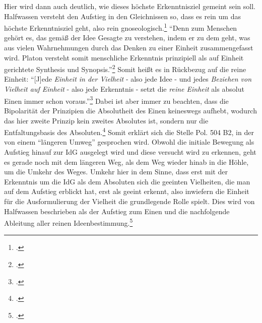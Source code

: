 Hier wird dann auch deutlich, wie dieses höchste Erkenntnisziel gemeint sein soll.
Halfwassen versteht den Aufstieg in den Gleichnissen so, dass es rein um das höchste Erkenntnisziel geht, also rein gnoseologisch.\footcite[vgl.][S. 226]{halfwassenaufstieg2006}
\enquote{Denn zum Menschen gehört es, das gemäß der Idee Gesagte zu verstehen, indem er zu dem geht, was aus vielen Wahrnehmungen durch das Denken zu einer Einheit zusammengefasst wird. Platon versteht somit menschliche Erkenntnis prinzipiell als auf Einheit gerichtete Synthesis und Synopsis.}\footcite[][S. 228]{halfwassenaufstieg2006}
Somit heißt es in Rückbezug auf die reine Einheit:
\enquote{[J]ede \emph{Einheit in der Vielheit} - also jede Idee - und jedes \emph{Beziehen von Vielheit auf Einheit} - also jede Erkenntnis - setzt die \emph{reine Einheit} als absolut Einen immer schon voraus.}\footcite[][S. 230]{halfwassenaufstieg2006}
Dabei ist aber immer zu beachten, dass die Bipolarität der Prinzipien die Absolutheit des Einen keineswegs aufhebt, wodurch das hier zweite Prinzip kein zweites Absolutes ist, sondern nur die Entfaltungsbasis des Absoluten.\footcite[vgl.][S. 53]{HalfwassenGeistmetaphysik}
Somit erklärt sich die Stelle Pol. 504 B2, in der von einem \enquote{längeren Umweg} gesprochen wird. Obwohl die initiale Bewegung als Aufstieg hinauf zur IdG ausgelegt wird und diese versucht wird zu erkennen, geht es gerade noch mit dem längeren Weg, als dem Weg wieder hinab in die Höhle, um die Umkehr des Weges. Umkehr hier in dem Sinne, dass erst mit der Erkenntnis um die IdG als dem Absoluten sich die geeinten Vielheiten, die man auf dem Aufstieg erblickt hat, erst als geeint erkennt, also inwiefern die Einheit für die Ausformulierung der Vielheit die grundlegende Rolle spielt. Dies wird von Halfwassen beschrieben als der Aufstieg zum Einen und die nachfolgende Ableitung aller reinen Ideenbestimmung.\footcite[vgl.][S. 231]{halfwassenaufstieg2006} 
